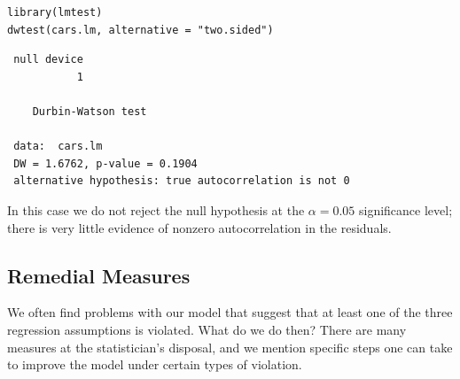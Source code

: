 \documentclass[captions=tableheading]{scrbook}
\begin{document}
\begin{verbatim}
library(lmtest)
dwtest(cars.lm, alternative = "two.sided")
\end{verbatim}

\begin{verbatim}
 null device 
           1
  
 	Durbin-Watson test
 
 data:  cars.lm 
 DW = 1.6762, p-value = 0.1904
 alternative hypothesis: true autocorrelation is not 0
\end{verbatim}

In this case we do not reject the null hypothesis at the \(\alpha=0.05\) significance level; there is very little evidence of nonzero autocorrelation in the residuals.
\subsection{Remedial Measures}
\label{sec-1-4-4}


We often find problems with our model that suggest that at least one of the three regression assumptions is violated. What do we do then? There are many measures at the statistician's disposal, and we mention specific steps one can take to improve the model under certain types of violation.
\end{document}
